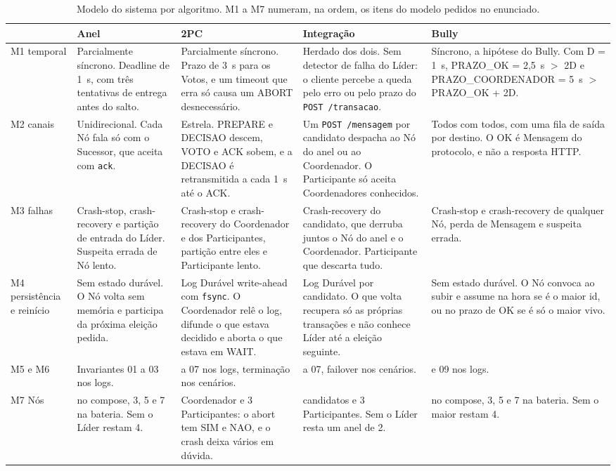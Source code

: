 \documentclass[conference]{IEEEtran}
\newcommand{\cod}[1]{\texttt{\upshape #1}}
\begin{document}
\begin{table}[t]
\caption{Modelo do sistema por algoritmo. M1 a M7 numeram, na ordem, os itens do modelo pedidos no
enunciado.}
\label{tab:modelo}
\centering
\footnotesize
\setlength{\tabcolsep}{3pt}
\renewcommand{\arraystretch}{1.1}
\begin{tabular}{@{}>{\raggedright\arraybackslash}p{1.35cm}
  *{4}{>{\raggedright\arraybackslash}p{3.95cm}}@{}}
\toprule
& \textbf{Anel} & \textbf{2PC} & \textbf{Integração} & \textbf{Bully} \\
\midrule
M1 temporal & Parcialmente síncrono. Deadline de 1~s, com três tentativas de entrega antes do
salto. & Parcialmente síncrono. Prazo de 3~s para os Votos, e um timeout que erra só causa um
ABORT desnecessário. & Herdado dos dois. Sem detector de falha do Líder: o cliente percebe a
queda pelo erro ou pelo prazo do \cod{POST /transacao}. & Síncrono, a hipótese do Bully. Com
D = 1~s, PRAZO\_OK = 2,5~s $>$ 2D e PRAZO\_COORDENADOR = 5~s $>$ PRAZO\_OK + 2D. \\
M2 canais & Unidirecional. Cada Nó fala só com o Sucessor, que aceita com \cod{ack}. & Estrela.
PREPARE e DECISAO descem, VOTO e ACK sobem, e a DECISAO é retransmitida a cada 1~s até o ACK. &
Um \cod{POST /mensagem} por candidato despacha ao Nó do anel ou ao Coordenador. O Participante só
aceita Coordenadores conhecidos. & Todos com todos, com uma fila de saída por destino. O OK é
Mensagem do protocolo, e não a resposta HTTP. \\
M3 falhas & Crash-stop, crash-recovery e partição de entrada do Líder. Suspeita errada de Nó
lento. & Crash-stop e crash-recovery do Coordenador e dos Participantes, partição entre eles e
Participante lento. & Crash-recovery do candidato, que derruba juntos o Nó do anel e o
Coordenador. Participante que descarta tudo. & Crash-stop e crash-recovery de qualquer Nó, perda
de Mensagem e suspeita errada. \\
M4 persistência e reinício & Sem estado durável. O Nó volta sem memória e participa da próxima
eleição pedida. & Log Durável write-ahead com \cod{fsync}. O Coordenador relê o log, difunde o que
estava decidido e aborta o que estava em WAIT. & Log Durável por candidato. O que volta recupera
só as próprias transações e não conhece Líder até a eleição seguinte. & Sem estado durável. O Nó
convoca ao subir e assume na hora se é o maior id, ou no prazo de OK se é só o maior vivo. \\
M5 e M6 & Invariantes 01 a 03 nos logs. & 04 a 07 nos logs, terminação nos cenários. & 01 a 07,
failover nos cenários. & 08 e 09 nos logs. \\
M7 Nós & 5 no compose, 3, 5 e 7 na bateria. Sem o Líder restam 4. & 1 Coordenador e 3
Participantes: o abort tem SIM e NAO, e o crash deixa vários em dúvida. & 3 candidatos e 3
Participantes. Sem o Líder resta um anel de 2. & 5 no compose, 3, 5 e 7 na bateria. Sem o maior
restam 4. \\
\bottomrule
\end{tabular}
\end{table}
\end{document}
